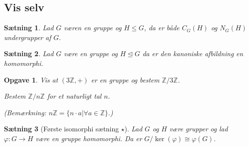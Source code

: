 \documentclass{article}
\newcommand{\Z}{\mathbb{Z}}
\newcommand{\too}{\rightarrow}
\newtheorem{opg}{Opgave}
\newtheorem{setn}{Sætning}
\begin{document}
		\subsection*{Vis selv}
		\begin{setn}
			Lad $G$ væren en gruppe og $H \le G$, da er både $C_G(H)$ og $N_G(H)$ undergrupper
			af $G$.
		\end{setn}
		\begin{setn}
			Lad $G$ være en gruppe og $H \unlhd G$ da er
			den kanoniske afbildning en homomorphi.
		\end{setn}
		\begin{opg}
			Vis at $(3\Z,+)$ er en gruppe og bestem $\Z/3\Z$.

			Bestem $\Z/n\Z$ for et naturligt tal $n$.

			(Bemærkning: $n\Z = \{n\cdot a| \forall a \in \Z\}$.)
		\end{opg}
		\begin{setn}[Første isomorphi sætning $\star$] \label{Iso1}
			Lad $G$ og $H$ være grupper og lad $\varphi: G \too H$ være en gruppe homomorphi.
			Da er $G/\ker(\varphi) \cong \varphi(G)$.
		\end{setn}
\end{document}
